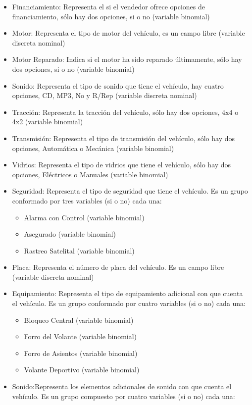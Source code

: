 \documentclass[a4paper]{article}
\begin{document}
\begin{itemize}
\item Financiamiento: Representa el si el vendedor ofrece opciones de financiamiento, sólo hay dos opciones, si o no (variable binomial)
\item Motor: Representa el tipo de motor del vehículo, es un campo libre (variable discreta nominal)
\item Motor Reparado: Indica si el motor ha sido reparado últimamente, sólo hay dos opciones, si o no (variable binomial)
\item Sonido: Representa el tipo de sonido que tiene el vehículo, hay cuatro opciones, CD, MP3, No y R/Rep (variable discreta nominal)
\item Tracción: Representa la tracción del vehículo, sólo hay dos opciones, 4x4 o 4x2 (variable binomial)
\item Transmisión: Representa el tipo de transmisión del vehículo, sólo hay dos opciones, Automática o Mecánica (variable binomial)
\item Vidrios: Representa el tipo de vidrios que tiene el vehículo, sólo hay dos opciones, Eléctricos o Manuales (variable binomial)
\item Seguridad: Representa el tipo de seguridad que tiene el vehículo. Es un grupo conformado por tres variables (si o no) cada una:
\begin{itemize}
\item Alarma con Control (variable binomial)
\item Asegurado (variable binomial)
\item Rastreo Satelital (variable binomial)
\end{itemize}
\item Placa: Representa el número de placa del vehículo. Es un campo libre (variable discreta nominal)
\item Equipamiento: Representa el tipo de equipamiento adicional con que cuenta el vehículo. Es un grupo conformado por cuatro variables (si o no) cada una:
\begin{itemize}
\item Bloqueo Central (variable binomial)
\item Forro del Volante (variable binomial)
\item Forro de Asientos (variable binomial)
\item Volante Deportivo (variable binomial)
\end{itemize}
\item Sonido:Representa los elementos adicionales de sonido con que cuenta el vehículo. Es un grupo compuesto por cuatro variables (si o no) cada una:

\end{itemize}
\end{document}

